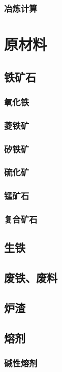 \documentclass[UTF8]{../../ApplicationUniverse}
\begin{document}
    \subsubsection{冶炼计算}
\section{原材料}
    \subsection{铁矿石}
        \subsubsection{氧化铁}
        \subsubsection{菱铁矿}
        \subsubsection{矽铁矿}
        \subsubsection{硫化矿}
        \subsubsection{锰矿石}
        \subsubsection{复合矿石}
    \subsection{生铁}
    \subsection{废铁、废料}
    \subsection{炉渣}
    \subsection{熔剂}
        \subsubsection{碱性熔剂}
\end{document}
